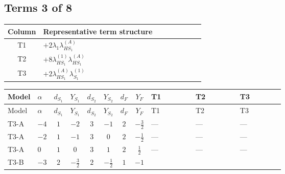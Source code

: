 \documentclass[8pt]{article}
\begin{document}
\begin{landscape}
\subsection*{Terms 3 of 8}
\begin{center}
\begin{tabular}{@{}c >{\raggedright\arraybackslash}p{0.82\linewidth}@{}}
\toprule
Column & Representative term structure \\
\midrule
T1 & \(\displaystyle +2 {\lambda_1} {\lambda_{HS_1}^{(A)}}\) \\
\midrule
T2 & \(\displaystyle +8 {\lambda_{HS_1}^{(1)}} {\lambda_{HS_1}^{(A)}}\) \\
\midrule
T3 & \(\displaystyle +2 {\lambda_{HS_1}^{(A)}} {\lambda_{S_1}^{(1)}}\) \\
\midrule
\bottomrule
\end{tabular}
\end{center}
\smallskip
\tiny
\begin{longtable}{@{}llcccccc >{\raggedright\arraybackslash}p{0.21\linewidth} >{\raggedright\arraybackslash}p{0.21\linewidth} >{\raggedright\arraybackslash}p{0.21\linewidth}@{}}
\toprule
Model & $\alpha$ & $d_{S_1}$ & $Y_{S_1}$ & $d_{S_2}$ & $Y_{S_2}$ & $d_F$ & $Y_F$ & T1 & T2 & T3 \\
\midrule
\endfirsthead
\toprule
Model & $\alpha$ & $d_{S_1}$ & $Y_{S_1}$ & $d_{S_2}$ & $Y_{S_2}$ & $d_F$ & $Y_F$ & T1 & T2 & T3 \\
\midrule
\endhead
T3-A & $-4$ & $1$ & $-2$ & $3$ & $-1$ & $2$ & $-\frac{3}{2}$ & --- & --- & --- \\
\midrule
T3-A & $-2$ & $1$ & $-1$ & $3$ & $0$ & $2$ & $-\frac{1}{2}$ & --- & --- & --- \\
\midrule
T3-A & $0$ & $1$ & $0$ & $3$ & $1$ & $2$ & $\frac{1}{2}$ & --- & --- & --- \\
\midrule
T3-B & $-3$ & $2$ & $-\frac{3}{2}$ & $2$ & $-\frac{1}{2}$ & $1$ & $-1$ & \scriptsize\adjustbox{max width=\linewidth}{$\begin{gathered} +2 {\lambda_1} {\lambda_{HS_1}^{(A)}}\end{gathered}$} & \scriptsize\adjustbox{max width=\linewidth}{$\begin{gathered} +8 {\lambda_{HS_1}^{(1)}} {\lambda_{HS_1}^{(A)}}\end{gathered}$} & \scriptsize\adjustbox{max width=\linewidth}{$\begin{gathered} +2 {\lambda_{HS_1}^{(A)}} {\lambda_{S_1}^{(1)}}\end{gathered}$} \\

\end{longtable}
\end{landscape}
\end{document}
